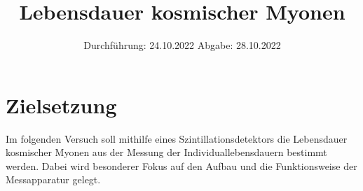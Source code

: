 

\usepackage[nolist,nohyperlinks]{acronym}

\usepackage{longtable}

\subject{V01}
\title{Lebensdauer kosmischer Myonen}
\date{
    Durchführung: 24.10.2022
     \hspace{3em}
    Abgabe: 28.10.2022
}


\maketitle
\thispagestyle{empty}
\tableofcontents
\newpage

\section{Zielsetzung}

    Im folgenden Versuch soll mithilfe eines Szintillationsdetektors die Lebensdauer kosmischer Myonen aus der Messung der Individuallebensdauern bestimmt werden.
    Dabei wird besonderer Fokus auf den Aufbau und die Funktionsweise der Messapparatur gelegt.


\clearpage


\clearpage


\clearpage


\clearpage

\printbibliography
\clearpage

\appendix



